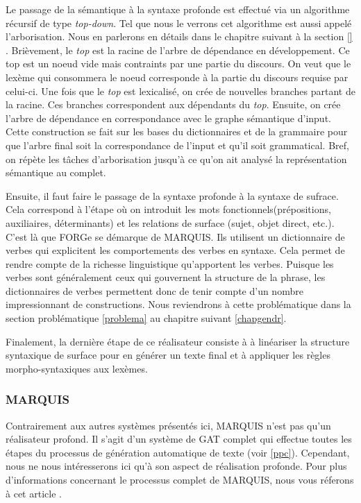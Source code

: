 Le passage de la sémantique à la syntaxe profonde est effectué via un algorithme récursif de type \emph{top-down}. Tel que nous le verrons cet algorithme est aussi appelé l'arborisation. Nous en parlerons en détails dans le chapitre suivant à la section \ref{} . Brièvement, le \emph{top} est la racine de l'arbre de dépendance en développement. Ce top est un noeud vide mais contraints par une partie du discours. On veut que le lexème qui consommera le noeud corresponde à la partie du discours requise par celui-ci. Une fois que le \emph{top} est lexicalisé, on crée de nouvelles branches partant de la racine. Ces branches correspondent aux dépendants du \emph{top}. Ensuite, on crée l'arbre de dépendance en correspondance avec le graphe sémantique d'input. Cette construction se fait sur les bases du dictionnaires et de la grammaire pour que l'arbre final soit la correspondance de l'input et qu'il soit grammatical. Bref, on répète les tâches d'arborisation jusqu'à ce qu'on ait analysé la représentation sémantique au complet.

Ensuite, il faut faire le passage de la syntaxe profonde à la syntaxe de sufrace. Cela correspond à l'étape où on introduit les mots fonctionnels(prépositions, auxiliaires, déterminants) et les relations de surface (sujet, objet direct, etc.). C'est là que FORGe se démarque de MARQUIS. Ils utilisent un dictionnaire de verbes qui explicitent les comportements des verbes en syntaxe. Cela permet de rendre compte de la richesse linguistique qu'apportent les verbes. Puisque les verbes sont généralement ceux qui gouvernent la structure de la phrase, les dictionnaires de verbes permettent donc de tenir compte d'un nombre impressionnant de constructions. Nous reviendrons à cette problématique dans la section problématique \ref{problema} au chapitre suivant \ref{chapgendr}.

Finalement, la dernière étape de ce réalisateur consiste à à linéariser la structure syntaxique de surface pour en générer un texte final et à appliquer les règles morpho-syntaxiques aux lexèmes.

\subsubsection{MARQUIS}\label{sectionmarquis}
Contrairement aux autres systèmes présentés ici, MARQUIS n'est pas qu'un réalisateur profond. Il s'agit d'un système de \ac{GAT} complet qui effectue toutes les étapes du processus de génération automatique de texte (voir \ref{ppc}). Cependant, nous ne nous intéresserons ici qu'à son aspect de réalisation profonde. Pour plus d'informations concernant le processus complet de MARQUIS, nous vous réferons à cet article \citep{WannerMARQUISGENERATIONUSERTAILORED2010}. 

